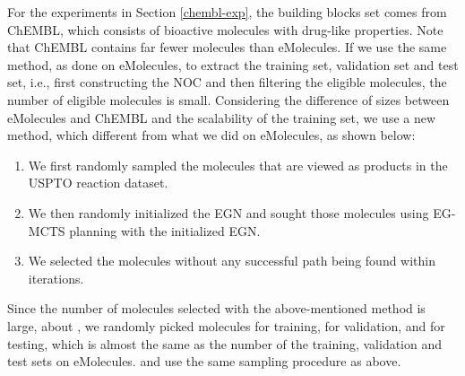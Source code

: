 \documentclass[sn-mathphys,Numbered]{sn-jnl}
\begin{document}
For the experiments in Section \ref{chembl-exp}, the building blocks set  comes from ChEMBL, which consists of  bioactive molecules with drug-like properties. Note that ChEMBL contains far fewer molecules than eMolecules. If we use the same method, as done on eMolecules, to extract the training set, validation set and test set, i.e., first constructing the NOC and then filtering the eligible molecules, the number of eligible molecules is small.
Considering the difference of sizes between eMolecules and ChEMBL and the scalability of the training set, we use a new method, which different from what we did on eMolecules, as shown below:
\begin{enumerate}
\item We first randomly sampled the molecules that are viewed as products in the USPTO reaction dataset.
\item We then randomly initialized the EGN and
sought those molecules using EG-MCTS planning with the initialized EGN. 
\item We selected the molecules without any successful path being found within  iterations.
\end{enumerate}
Since the number of molecules selected with the above-mentioned method is large, about , we randomly picked  molecules for training,  for validation, and  for testing, which is almost the same as the number of the training, validation and test sets on eMolecules.  and  use the same sampling procedure as above.
\end{document}
